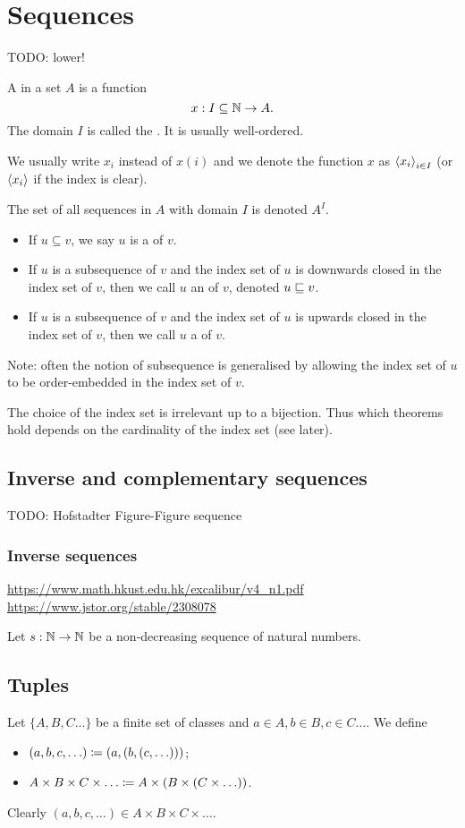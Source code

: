 \section{Sequences }
TODO: lower!
\begin{definition}
A  in a set $A$ is a function
\[ x:I\subseteq\mathbb{N}\to A. \]
The domain $I$ is called the . It is usually well-ordered.

We usually write $x_i$ instead of $x(i)$ and we denote the function $x$ as $\left\langle x_i \right\rangle_{i\in I}$ (or $\left\langle x_i \right\rangle$ if the index is clear).

The set of all sequences in $A$ with domain $I$ is denoted $A^I$.

\begin{itemize}
\item If $u \subseteq v$, we say $u$ is a  of $v$.
\item If $u$ is a subsequence of $v$ and the index set of $u$ is downwards closed in the index set of $v$, then we call $u$ an  of $v$, denoted $u \sqsubseteq v$.
\item If $u$ is a subsequence of $v$ and the index set of $u$ is upwards closed in the index set of $v$, then we call $u$ a  of $v$.
\end{itemize}
Note: often the notion of subsequence is generalised by allowing the index set of $u$ to be order-embedded in the index set of $v$.
\end{definition}
The choice of the index set is irrelevant up to a bijection. Thus which theorems hold depends on the cardinality of the index set (see later).


\subsection{Inverse and complementary sequences}
TODO: Hofstadter Figure-Figure sequence
\subsubsection{Inverse sequences}
\url{https://www.math.hkust.edu.hk/excalibur/v4_n1.pdf}
\url{https://www.jstor.org/stable/2308078}
\begin{definition}
Let $s:\mathbb{N}\to\mathbb{N}$ be a non-decreasing sequence of natural numbers.
\end{definition}


\subsection{Tuples}
\begin{definition}
Let $\{A,B,C \ldots \}$ be a finite set of classes and $a\in A, b\in B, c\in C \ldots$. We define
\begin{itemize}
\item $(a,b,c,\ldots) \coloneqq (a, (b,(c,\ldots)))$;
\item $A\times B\times C\times\ldots \coloneqq A\times(B\times (C\times \ldots))$.
\end{itemize}
\end{definition}
Clearly $(a,b,c,\ldots)\in A\times B\times C\times\ldots$.

